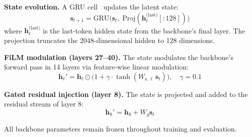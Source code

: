 \documentclass[11pt,a4paper]{article}
\begin{document}
\textbf{State evolution.} A GRU cell~\cite{cho2014learning} updates the latent state:
\begin{equation}
    \mathbf{s}_{t+1} = \text{GRU}\big(\mathbf{s}_t,\; \text{Proj}(\mathbf{h}_t^{\text{(last)}}[:128])\big)\label{eq:gru}
\end{equation}
where $\mathbf{h}_t^{\text{(last)}}$ is the last-token hidden state from the backbone's final layer. The projection truncates the 2048-dimensional hidden to 128 dimensions.

\textbf{FiLM modulation (layers 27--40).} The state modulates the backbone's forward pass in 14 layers via feature-wise linear modulation:
\begin{equation}
    \mathbf{h}_\ell' = \mathbf{h}_\ell \odot \big(1 + \gamma \cdot \tanh(W_{\text{s},\ell}\,\mathbf{s}_t)\big),\quad \gamma = 0.1\label{eq:film}
\end{equation}

\textbf{Gated residual injection (layer 8).} The state is projected and added to the residual stream of layer 8:
\begin{equation}
    \mathbf{h}_8' = \mathbf{h}_8 + W_g \mathbf{s}_t\label{eq:gate}
\end{equation}

All backbone parameters remain frozen throughout training and evaluation.
\end{document}
